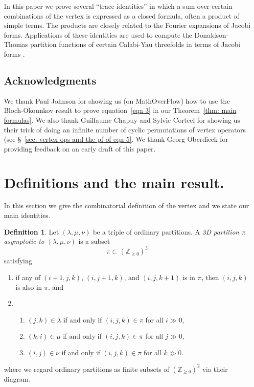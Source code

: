 \documentclass[12pt]{amsart}
\newcommand{\znums} {{\mathbb Z}}		%
\theoremstyle{definition}
\newtheorem{defn}[theorem]{Definition}
\begin{document}
In this paper we prove several ``trace identities'' in which a sum
over certain combinations of the vertex is expressed as a closed
formula, often a product of simple terms. The products are closely
related to the Fourier expansions of Jacobi forms. Applications of
these identities are used to compute the Donaldson-Thomas partition
functions of certain Calabi-Yau threefolds in terms of Jacobi forms
\cite{Bryan-K3xE,Bryan-Kool,BOPY}.

\subsection{Acknowledgments}\label{acknowledgments} We thank Paul
Johnson for showing us (on MathOverFlow) how to use the Bloch-Okounkov
result \cite{Bloch-Okounkov} to prove equation~\eqref{eqn 3} in our
Theorem~\ref{thm: main formulas}. We also thank Guillaume Chapuy and
Sylvie Corteel for showing us their trick of doing an infinite number
of cyclic permutations of vertex operators (see \S~\ref{sec: vertex
ops and the pf of eqn 5}. We thank Georg Oberdieck for providing
feedback on an early draft of this paper.






\section{Definitions and the main result.}\label{sec: defns and
result}

In this section we give the combinatorial definition of the vertex and
we state our main identities.

\begin{defn}\label{defn: 3D partition asympt to (a,b,c)} Let $(\lambda
,\mu ,\nu )$ be a triple of ordinary partitions. A \emph{3D
partition $\pi $ asymptotic to $(\lambda ,\mu ,\nu )$} is a subset
\[
\pi \subset \left(\znums _{\geq 0} \right)^{3}
\]
satisfying
\begin{enumerate}
\item if any of $(i+1,j,k)$, $(i,j+1,k)$, and $(i,j,k+1)$ is in $\pi
$, then $(i,j,k)$ is also in $\pi $, and
\item
\begin{enumerate}
\item $(j,k)\in \lambda $ if and only if $(i,j,k)\in \pi $ for all $i\gg 0$,
\item $(k,i)\in \mu  $ if and only if $(i,j,k)\in \pi $ for all $j\gg 0$,
\item $(i,j)\in \nu  $ if and only if $(i,j,k)\in \pi $ for all $k\gg 0$.
\end{enumerate}
\end{enumerate}
where we regard ordinary partitions as finite subsets of $\left(\znums
_{\geq 0} \right)^{2}$ via their diagram.
\end{defn}
\end{document}
